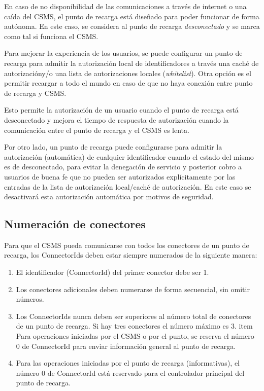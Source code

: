 \documentclass[12pt,a4paper,onecolumn,oneside]{report}
\begin{document}
En caso de no disponibilidad de las comunicaciones a través de internet o una caída del CSMS, el punto de recarga está diseñado para poder funcionar de forma autónoma. En este caso, se considera al punto de recarga \textit{desconectado} y se marca como tal si funciona el CSMS.

Para mejorar la experiencia de los usuarios, se puede configurar un punto de recarga para admitir la autorización local de identificadores a través una caché de autorizacióny/o una lista de autorizaciones locales (\textit{whitelist}). Otra opción es el permitir recargar a todo el mundo en caso de que no haya conexión entre punto de recarga y CSMS. 

Esto permite la autorización de un usuario cuando el punto de recarga está desconectado y mejora el tiempo de respuesta de autorización cuando la comunicación entre el punto de recarga y el CSMS es lenta.

Por otro lado, un punto de recarga puede configurarse para admitir la autorización (automática) de cualquier identificador cuando el estado del mismo es de desconectado, para evitar la denegación de servicio y posterior cobro a usuarios de buena fe que no pueden ser autorizados explícitamente por las entradas de la lista de autorización local/caché de autorización. En este caso se desactivará esta autorización automática por motivos de seguridad.


\subsection{Numeración de conectores}
\label{Numeración de conectores}

Para que el CSMS pueda comunicarse con todos los conectores de un punto de recarga, los ConnectorIds deben estar siempre numerados de la siguiente manera:

\begin{enumerate}

\item El identificador (ConnectorId) del primer conector debe ser 1.
\item Los conectores adicionales deben numerarse de forma secuencial, sin omitir números.
\item Los ConnectorIds nunca deben ser superiores al número total de conectores de un punto de recarga. Si hay tres conectores el número máximo es 3.
item Para operaciones iniciadas por el CSMS o por el punto, se reserva el número 0 de ConnectorId para enviar información general al punto de recarga.
\item Para las operaciones iniciadas por el punto de recarga (informativas), el número 0 de ConnectorId está reservado para el controlador principal del punto de recarga.

\end{enumerate}
\end{document}
